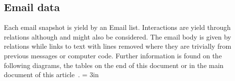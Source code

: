 \begin{apendicesenv}
											      \section{Email data}
											      Each email snapshot is yield by an Email list.
											      Interactions are yield through  relations
											      although  and  might also be considered.
											      The email body is given by  relations while
											       links to text with lines removed where they are
											      trivially from previous messages or computer code.
											      Further information is found on the following diagrams, the tables on
											      the end of this document or in the main document of this
											      article~\cite{losd}.
													    \textheight = 3in
													    \pdfpageheight 6in


\end{apendicesenv}
